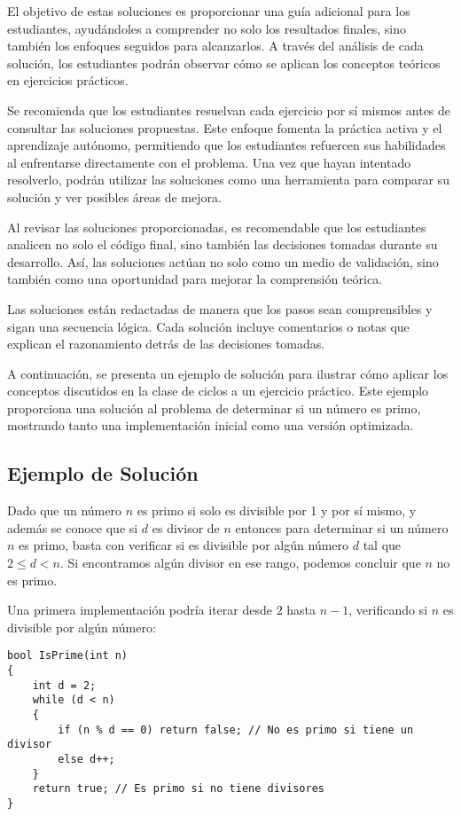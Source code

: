 \documentclass{article}
\begin{document}
El objetivo de estas soluciones es proporcionar una guía adicional para los estudiantes, ayudándoles a comprender no solo los resultados finales, sino también los enfoques seguidos para alcanzarlos. A través del análisis de cada solución, los estudiantes podrán observar cómo se aplican los conceptos teóricos en ejercicios prácticos.

Se recomienda que los estudiantes resuelvan cada ejercicio por sí mismos antes de consultar las soluciones propuestas. Este enfoque fomenta la práctica activa y el aprendizaje autónomo, permitiendo que los estudiantes refuercen sus habilidades al enfrentarse directamente con el problema. Una vez que hayan intentado resolverlo, podrán utilizar las soluciones como una herramienta para comparar su solución y ver posibles áreas de mejora.

Al revisar las soluciones proporcionadas, es recomendable que los estudiantes analicen no solo el código final, sino también las decisiones tomadas durante su desarrollo. Así, las soluciones actúan no solo como un medio de validación, sino también como una oportunidad para mejorar la comprensión teórica.

Las soluciones están redactadas de manera que los pasos sean comprensibles y sigan una secuencia lógica. Cada solución incluye comentarios o notas que explican el razonamiento detrás de las decisiones tomadas.

A continuación, se presenta un ejemplo de solución para ilustrar cómo aplicar los conceptos discutidos en la clase de ciclos a un ejercicio práctico. Este ejemplo proporciona una solución al problema de determinar si un número es primo, mostrando tanto una implementación inicial como una versión optimizada.

\subsection*{Ejemplo de Solución}

Dado que un número \(n\) es primo si solo es divisible por 1 y por sí mismo, y además se conoce que si \(d\) es divisor de \(n\) entonces para determinar si un número \(n\) es primo, basta con verificar si es divisible por algún número \(d\) tal que \(2 \leq d < n\). Si encontramos algún divisor en ese rango, podemos concluir que \(n\) no es primo.

Una primera implementación podría iterar desde \(2\) hasta \(n - 1\), verificando si \(n\) es divisible por algún número:

\begin{lstlisting}
bool IsPrime(int n)
{
    int d = 2;
    while (d < n)
    {
        if (n % d == 0) return false; // No es primo si tiene un divisor
        else d++;
    }
    return true; // Es primo si no tiene divisores
}
\end{lstlisting}
\end{document}
